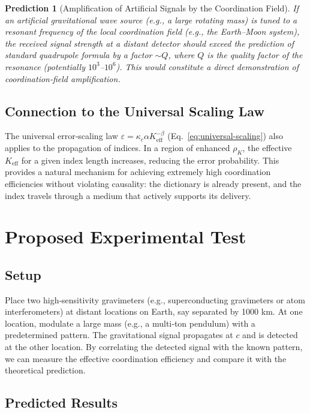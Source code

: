 \documentclass[12pt,a4paper]{article}
\newcommand{\Keff}{K_{\mathrm{eff}}}
\newcommand{\kappac}{\kappa_c}
\newcommand{\eps}{\varepsilon}
\newtheorem{prediction}{Prediction}   %
\begin{document}
	\begin{prediction}[Amplification of Artificial Signals by the Coordination Field]
		If an artificial gravitational wave source (e.g., a large rotating mass) is tuned to a resonant frequency of the local coordination field (e.g., the Earth–Moon system), the received signal strength at a distant detector should exceed the prediction of standard quadrupole formula by a factor \(\sim Q\), where \(Q\) is the quality factor of the resonance (potentially \(10^3\)–\(10^6\)). This would constitute a direct demonstration of coordination‑field amplification.
	\end{prediction}
	
	\subsection{Connection to the Universal Scaling Law}
	
	The universal error‑scaling law \(\eps = \kappac\alpha\Keff^{-\beta}\) (Eq.~\ref{eq:universal-scaling}) also applies to the propagation of indices. In a region of enhanced \(\rho_K\), the effective \(\Keff\) for a given index length increases, reducing the error probability. This provides a natural mechanism for achieving extremely high coordination efficiencies without violating causality: the dictionary is already present, and the index travels through a medium that actively supports its delivery.
	
	\section{Proposed Experimental Test}
	\label{sec:experiment}
	
	\subsection{Setup}
	
	Place two high‑sensitivity gravimeters (e.g., superconducting gravimeters or atom interferometers) at distant locations on Earth, say separated by 1000 km. At one location, modulate a large mass (e.g., a multi‑ton pendulum) with a predetermined pattern. The gravitational signal propagates at \(c\) and is detected at the other location. By correlating the detected signal with the known pattern, we can measure the effective coordination efficiency and compare it with the theoretical prediction.
	
	\subsection{Predicted Results}
	
\end{document}

